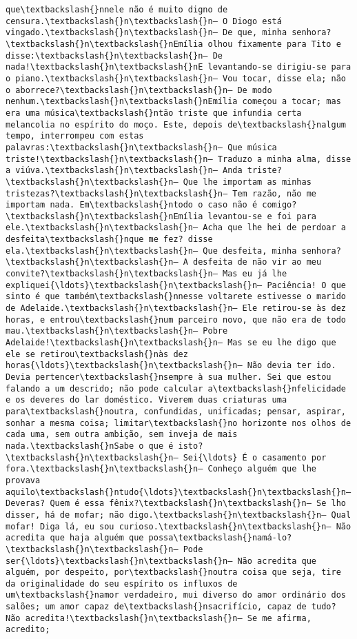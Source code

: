 \begin{Verbatim}[commandchars=\\\{\}]
que\textbackslash{}nnele não é muito digno de censura.\textbackslash{}n\textbackslash{}n— O Diogo está vingado.\textbackslash{}n\textbackslash{}n— De que, minha senhora?\textbackslash{}n\textbackslash{}nEmília olhou fixamente para Tito e disse:\textbackslash{}n\textbackslash{}n— De nada!\textbackslash{}n\textbackslash{}nE levantando-se dirigiu-se para o piano.\textbackslash{}n\textbackslash{}n— Vou tocar, disse ela; não o aborrece?\textbackslash{}n\textbackslash{}n— De modo nenhum.\textbackslash{}n\textbackslash{}nEmília começou a tocar; mas era uma música\textbackslash{}ntão triste que infundia certa melancolia no espírito do moço. Este, depois de\textbackslash{}nalgum tempo, interrompeu com estas palavras:\textbackslash{}n\textbackslash{}n— Que música triste!\textbackslash{}n\textbackslash{}n— Traduzo a minha alma, disse a viúva.\textbackslash{}n\textbackslash{}n— Anda triste?\textbackslash{}n\textbackslash{}n— Que lhe importam as minhas tristezas?\textbackslash{}n\textbackslash{}n— Tem razão, não me importam nada. Em\textbackslash{}ntodo o caso não é comigo?\textbackslash{}n\textbackslash{}nEmília levantou-se e foi para ele.\textbackslash{}n\textbackslash{}n— Acha que lhe hei de perdoar a desfeita\textbackslash{}nque me fez? disse ela.\textbackslash{}n\textbackslash{}n— Que desfeita, minha senhora?\textbackslash{}n\textbackslash{}n— A desfeita de não vir ao meu convite?\textbackslash{}n\textbackslash{}n— Mas eu já lhe expliquei{\ldots}\textbackslash{}n\textbackslash{}n— Paciência! O que sinto é que também\textbackslash{}nnesse voltarete estivesse o marido de Adelaide.\textbackslash{}n\textbackslash{}n— Ele retirou-se às dez horas, e entrou\textbackslash{}num parceiro novo, que não era de todo mau.\textbackslash{}n\textbackslash{}n— Pobre Adelaide!\textbackslash{}n\textbackslash{}n— Mas se eu lhe digo que ele se retirou\textbackslash{}nàs dez horas{\ldots}\textbackslash{}n\textbackslash{}n— Não devia ter ido. Devia pertencer\textbackslash{}nsempre à sua mulher. Sei que estou falando a um descrido; não pode calcular a\textbackslash{}nfelicidade e os deveres do lar doméstico. Viverem duas criaturas uma para\textbackslash{}noutra, confundidas, unificadas; pensar, aspirar, sonhar a mesma coisa; limitar\textbackslash{}no horizonte nos olhos de cada uma, sem outra ambição, sem inveja de mais nada.\textbackslash{}nSabe o que é isto?\textbackslash{}n\textbackslash{}n— Sei{\ldots} É o casamento por fora.\textbackslash{}n\textbackslash{}n— Conheço alguém que lhe provava aquilo\textbackslash{}ntudo{\ldots}\textbackslash{}n\textbackslash{}n— Deveras? Quem é essa fênix?\textbackslash{}n\textbackslash{}n— Se lho disser, há de mofar; não digo.\textbackslash{}n\textbackslash{}n— Qual mofar! Diga lá, eu sou curioso.\textbackslash{}n\textbackslash{}n— Não acredita que haja alguém que possa\textbackslash{}namá-lo?\textbackslash{}n\textbackslash{}n— Pode ser{\ldots}\textbackslash{}n\textbackslash{}n— Não acredita que alguém, por despeito, por\textbackslash{}noutra coisa que seja, tire da originalidade do seu espírito os influxos de um\textbackslash{}namor verdadeiro, mui diverso do amor ordinário dos salões; um amor capaz de\textbackslash{}nsacrifício, capaz de tudo? Não acredita!\textbackslash{}n\textbackslash{}n— Se me afirma, acredito; 
\end{Verbatim}
